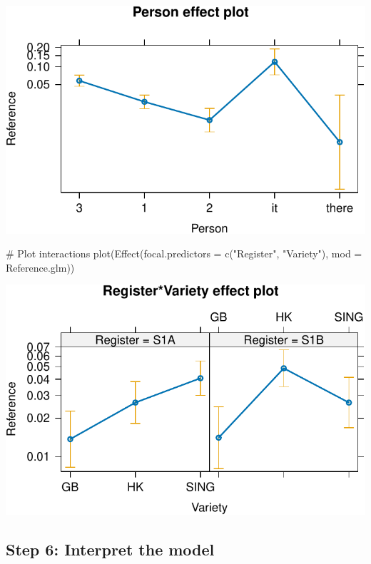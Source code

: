 \documentclass[
  11pt,
  letterpaper,
  DIV=11,
  numbers=noendperiod]{scrreprt}
\newenvironment{Shaded}{\begin{snugshade}}{\end{snugshade}}
\newcommand{\AttributeTok}[1]{\textcolor[rgb]{0.40,0.45,0.13}{#1}}
\newcommand{\CommentTok}[1]{\textcolor[rgb]{0.37,0.37,0.37}{#1}}
\newcommand{\FunctionTok}[1]{\textcolor[rgb]{0.28,0.35,0.67}{#1}}
\newcommand{\NormalTok}[1]{\textcolor[rgb]{0.00,0.23,0.31}{#1}}
\newcommand{\StringTok}[1]{\textcolor[rgb]{0.13,0.47,0.30}{#1}}
\begin{document}
\includegraphics{Logistic_regression_files/figure-pdf/unnamed-chunk-12-5.pdf}

\begin{Shaded}
\begin{Highlighting}[]
\CommentTok{\# Plot interactions}
\FunctionTok{plot}\NormalTok{(}\FunctionTok{Effect}\NormalTok{(}\AttributeTok{focal.predictors =} \FunctionTok{c}\NormalTok{(}\StringTok{"Register"}\NormalTok{, }\StringTok{"Variety"}\NormalTok{), }\AttributeTok{mod =}\NormalTok{ Reference.glm))}
\end{Highlighting}
\end{Shaded}

\includegraphics{Logistic_regression_files/figure-pdf/unnamed-chunk-12-6.pdf}

\subsection{Step 6: Interpret the
model}\label{step-6-interpret-the-model}
\end{document}
